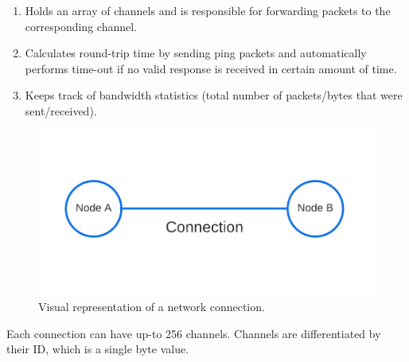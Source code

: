 \documentclass[times, utf8, diplomski]{fer}
\begin{document}
\begin{enumerate}
	\item Holds an array of channels and is responsible for forwarding packets to the corresponding channel.
	\item Calculates round-trip time by sending ping packets and automatically performs time-out if no valid response is received in certain amount of time.
	\item Keeps track of bandwidth statistics (total number of packets/bytes that were sent/received).
\end{enumerate}

\begin{figure}[H]
	\centering
	\includegraphics[scale=0.35]{Connection}
	\caption{Visual representation of a network connection.}
\end{figure}

Each connection can have up-to 256 channels. Channels are differentiated by their ID, which is a single byte value.
\end{document}
